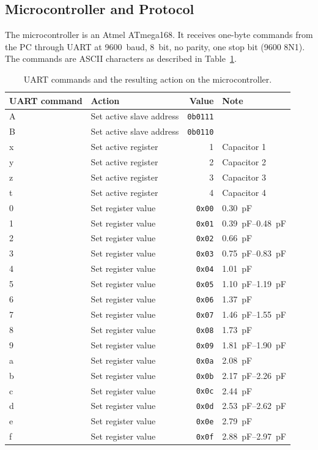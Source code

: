 \subsection{Microcontroller and Protocol}
The microcontroller is an Atmel ATmega168. It receives one-byte commands from the PC through UART at \SI{9600}{baud}, \SI{8}{bit}, no parity, one stop bit (9600 8N1). The commands are ASCII characters as described in Table~\ref{tab:rffe_commands}.

\begin{table}[htbp]
    \centering
    \begin{tabular}{|l|l|r|l|}
        \hline
        UART command & Action & Value & Note \\
        \hline
        A & Set active slave address & \texttt{0b0111} & \\
        B & Set active slave address & \texttt{0b0110} & \\
        \hline
        x & Set active register & 1 & Capacitor 1\\
        y & Set active register & 2 & Capacitor 2\\
        z & Set active register & 3 & Capacitor 3\\
        t & Set active register & 4 & Capacitor 4\\
        \hline
        0 & Set register value & \texttt{0x00} & \SI{0.30}{pF}\\
        1 & Set register value & \texttt{0x01} & \SIrange{0.39}{0.48}{pF}\\
        2 & Set register value & \texttt{0x02} & \SI{0.66}{pF}\\
        3 & Set register value & \texttt{0x03} & \SIrange{0.75}{0.83}{pF}\\
        4 & Set register value & \texttt{0x04} & \SI{1.01}{pF}\\
        5 & Set register value & \texttt{0x05} & \SIrange{1.10}{1.19}{pF}\\
        6 & Set register value & \texttt{0x06} & \SI{1.37}{pF}\\
        7 & Set register value & \texttt{0x07} & \SIrange{1.46}{1.55}{pF}\\
        8 & Set register value & \texttt{0x08} & \SI{1.73}{pF}\\
        9 & Set register value & \texttt{0x09} & \SIrange{1.81}{1.90}{pF}\\
        a & Set register value & \texttt{0x0a} & \SI{2.08}{pF}\\
        b & Set register value & \texttt{0x0b} & \SIrange{2.17}{2.26}{pF}\\
        c & Set register value & \texttt{0x0c} & \SI{2.44}{pF}\\
        d & Set register value & \texttt{0x0d} & \SIrange{2.53}{2.62}{pF}\\
        e & Set register value & \texttt{0x0e} & \SI{2.79}{pF}\\
        f & Set register value & \texttt{0x0f} & \SIrange{2.88}{2.97}{pF}\\
        \hline
    \end{tabular}
    \caption{UART commands and the resulting action on the microcontroller.}
    \label{tab:rffe_commands}
\end{table}

